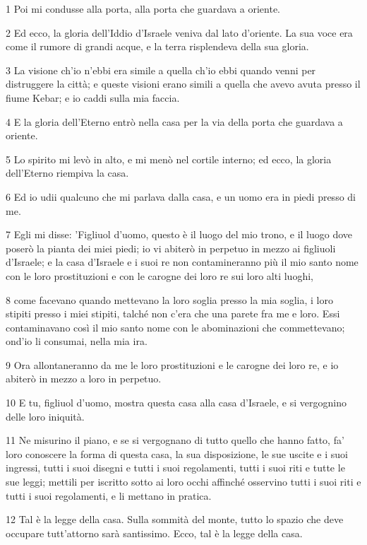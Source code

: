 \par 1 Poi mi condusse alla porta, alla porta che guardava a oriente.
\par 2 Ed ecco, la gloria dell'Iddio d'Israele veniva dal lato d'oriente. La sua voce era come il rumore di grandi acque, e la terra risplendeva della sua gloria.
\par 3 La visione ch'io n'ebbi era simile a quella ch'io ebbi quando venni per distruggere la città; e queste visioni erano simili a quella che avevo avuta presso il fiume Kebar; e io caddi sulla mia faccia.
\par 4 E la gloria dell'Eterno entrò nella casa per la via della porta che guardava a oriente.
\par 5 Lo spirito mi levò in alto, e mi menò nel cortile interno; ed ecco, la gloria dell'Eterno riempiva la casa.
\par 6 Ed io udii qualcuno che mi parlava dalla casa, e un uomo era in piedi presso di me.
\par 7 Egli mi disse: 'Figliuol d'uomo, questo è il luogo del mio trono, e il luogo dove poserò la pianta dei miei piedi; io vi abiterò in perpetuo in mezzo ai figliuoli d'Israele; e la casa d'Israele e i suoi re non contamineranno più il mio santo nome con le loro prostituzioni e con le carogne dei loro re sui loro alti luoghi,
\par 8 come facevano quando mettevano la loro soglia presso la mia soglia, i loro stipiti presso i miei stipiti, talché non c'era che una parete fra me e loro. Essi contaminavano così il mio santo nome con le abominazioni che commettevano; ond'io li consumai, nella mia ira.
\par 9 Ora allontaneranno da me le loro prostituzioni e le carogne dei loro re, e io abiterò in mezzo a loro in perpetuo.
\par 10 E tu, figliuol d'uomo, mostra questa casa alla casa d'Israele, e si vergognino delle loro iniquità.
\par 11 Ne misurino il piano, e se si vergognano di tutto quello che hanno fatto, fa' loro conoscere la forma di questa casa, la sua disposizione, le sue uscite e i suoi ingressi, tutti i suoi disegni e tutti i suoi regolamenti, tutti i suoi riti e tutte le sue leggi; mettili per iscritto sotto ai loro occhi affinché osservino tutti i suoi riti e tutti i suoi regolamenti, e li mettano in pratica.
\par 12 Tal è la legge della casa. Sulla sommità del monte, tutto lo spazio che deve occupare tutt'attorno sarà santissimo. Ecco, tal è la legge della casa.
